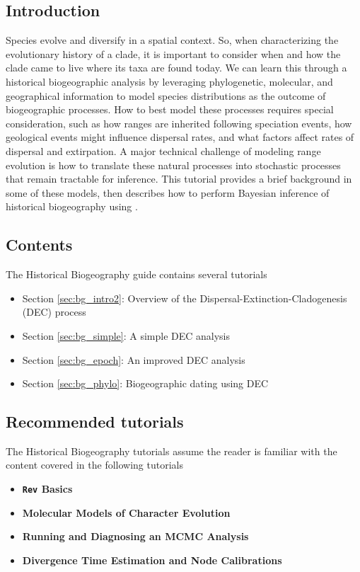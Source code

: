 \subsection{Introduction}

Species evolve and diversify in a spatial context.
So, when characterizing the evolutionary history of a clade, it is important to consider when and how the clade came to live where its taxa are found today.
We can learn this through a historical biogeographic analysis by leveraging phylogenetic, molecular, and geographical information to model species distributions as the outcome of biogeographic processes.
How to best model these processes requires special consideration, such as how ranges are inherited following speciation events, how geological events might influence dispersal rates, and what factors affect rates of dispersal and extirpation.
A major technical challenge of modeling range evolution is how to translate these natural processes into stochastic processes that remain tractable for inference.
This tutorial provides a brief background in some of these models, then describes how to perform Bayesian inference of historical biogeography using \RevBayes.

\subsection{Contents}

The Historical Biogeography guide contains several tutorials

\begin{itemize}
\item Section \ref{sec:bg_intro2}: Overview of the Dispersal-Extinction-Cladogenesis (DEC) process
\item Section \ref{sec:bg_simple}: A simple DEC analysis
\item Section \ref{sec:bg_epoch}: An improved DEC analysis
\item Section \ref{sec:bg_phylo}: Biogeographic dating using DEC
\end{itemize}

\subsection{Recommended tutorials}

The Historical Biogeography tutorials assume the reader is familiar with the content covered in the following \RevBayes tutorials

\begin{itemize}
\item {\bf {\tt \large Rev} Basics}
\item {\bf Molecular Models of Character Evolution}
\item {\bf Running and Diagnosing an MCMC Analysis}
\item {\bf Divergence Time Estimation and Node Calibrations}
\end{itemize}

\newpage
